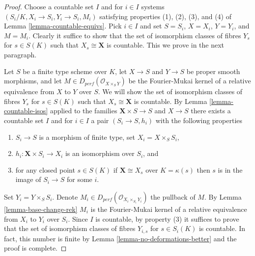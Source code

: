 \begin{proof}
Choose a countable set $I$ and for $i \in I$ systems
$(S_i/K, X_i \to S_i, Y_i \to S_i, M_i)$ satisfying properties
(1), (2), (3), and (4) of Lemma \ref{lemma-countable-equivs}.
Pick $i \in I$ and set $S = S_i$, $X = X_i$, $Y = Y_i$, and
$M = M_i$. Clearly it suffice to show that
the set of isomorphism classes of fibres $Y_s$ for $s \in S(K)$
such that $X_s \cong \mathbf{X}$ is countable.
This we prove in the next paragraph.

\medskip\noindent
Let $S$ be a finite type scheme over $K$, let $X \to S$ and $Y \to S$
be proper smooth morphisms, and let $M \in D_{perf}(\mathcal{O}_{X \times_S Y})$
be the Fourier-Mukai kernel of a relative equivalence from $X$
to $Y$ over $S$. We will show
the set of isomorphism classes of fibres $Y_s$ for $s \in S(K)$
such that $X_s \cong \mathbf{X}$ is countable.
By Lemma \ref{lemma-countable-isos} applied
to the families $\mathbf{X} \times S \to S$ and $X \to S$
there exists a countable set $I$ and for $i \in I$ a pair
$(S_i \to S, h_i)$ with the following properties
\begin{enumerate}
\item $S_i \to S$ is a morphism of finite type, set
$X_i = X \times_S S_i$,
\item $h_i : \mathbf{X} \times S_i \to X_i$
is an isomorphism over $S_i$, and
\item for any closed point $s \in S(K)$ if $\mathbf{X} \cong X_s$
over $K = \kappa(s)$ then $s$ is in the image of $S_i \to S$
for some $i$.
\end{enumerate}
Set $Y_i = Y \times_S S_i$. Denote
$M_i \in D_{perf}(\mathcal{O}_{X_i \times_{S_i} Y_i})$
the pullback of $M$. By Lemma \ref{lemma-base-change-rek}
$M_i$ is the Fourier-Mukai kernel of a relative equivalence from
$X_i$ to $Y_i$ over $S_i$. Since $I$ is countable, by
property (3) it suffices to prove that
the set of isomorphism classes of fibres $Y_{i, s}$ for $s \in S_i(K)$
is countable.
In fact, this number is finite by
Lemma \ref{lemma-no-deformations-better}
and the proof is complete.
\end{proof}














